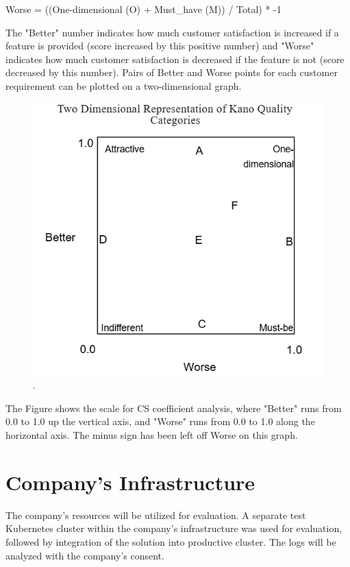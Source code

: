 \documentclass[../main.tex]{subfiles}
\begin{document}
Worse = ((One-dimensional (O) + Must\_have (M)) / Total) * -1

The "Better" number indicates how much customer satisfaction is increased if a feature is provided (score increased by this positive number) and "Worse" indicates how much customer satisfaction is decreased if the feature is not (score decreased by this number). Pairs of Better and Worse points for each customer requirement can be plotted on a two-dimensional graph.

\begin{figure}[H]
        \centering
        \includegraphics[]{img/3-background/kano/2dkano.png}
        \caption{ \cite{berger1993kano}.}
        \label{fig:2dkano}
\end{figure}

The Figure \cite{fig:2dkano} shows the scale for CS coefficient analysis, where "Better" runs from 
0.0 to 1.0 up the vertical axis, and "Worse" runs from 0.0 to 1.0 along the horizontal axis. The minus sign has been left off Worse on this graph.

\section{Company's Infrastructure}

The company's resources will be utilized for evaluation. A separate test Kubernetes cluster within the company's infrastructure was used for evaluation, followed by integration of the solution into productive cluster.
The logs will be analyzed with the company's consent.
\end{document}

